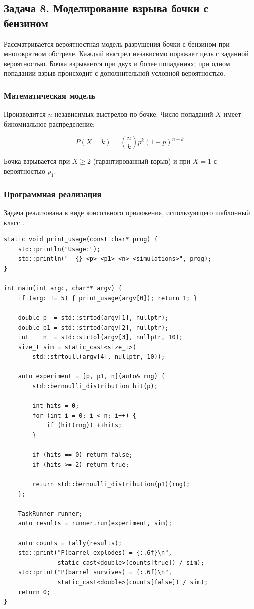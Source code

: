 \documentclass[14pt]{extarticle}
\renewcommand{\texttt}[1]{{\codefont \seqsplit{#1}}}
\begin{document}
\clearpage
\subsection{Задача 8. Моделирование взрыва бочки с бензином}
\label{sec:orged1e82e}

Рассматривается вероятностная модель разрушения бочки с бензином при многократном обстреле. Каждый выстрел независимо поражает цель с заданной вероятностью. Бочка взрывается при двух и более попаданиях; при одном попадании взрыв происходит с дополнительной условной вероятностью.
\subsubsection{Математическая модель}
\label{sec:orgaa5fbb5}

Производится \(n\) независимых выстрелов по бочке. Число попаданий \(X\) имеет биномиальное распределение:

$$P(X = k) = \binom{n}{k} p^k (1-p)^{n-k}$$

Бочка взрывается при \(X \ge 2\) (гарантированный взрыв) и при \(X = 1\) с вероятностью \(p_1\).
\subsubsection{Программная реализация}
\label{sec:orge2c9e51}

Задача реализована в виде консольного приложения, использующего шаблонный класс \texttt{TaskRunner}.

\begin{listing}[htbp]
\caption{Полная программа моделирования взрыва бочки}
\begin{verbatim}
static void print_usage(const char* prog) {
    std::println("Usage:");
    std::println("  {} <p> <p1> <n> <simulations>", prog);
}

int main(int argc, char** argv) {
    if (argc != 5) { print_usage(argv[0]); return 1; }

    double p  = std::strtod(argv[1], nullptr);
    double p1 = std::strtod(argv[2], nullptr);
    int    n  = std::strtol(argv[3], nullptr, 10);
    size_t sim = static_cast<size_t>(
        std::strtoull(argv[4], nullptr, 10));

    auto experiment = [p, p1, n](auto& rng) {
        std::bernoulli_distribution hit(p);

        int hits = 0;
        for (int i = 0; i < n; i++) {
            if (hit(rng)) ++hits;
        }

        if (hits == 0) return false;
        if (hits >= 2) return true;

        return std::bernoulli_distribution(p1)(rng);
    };

    TaskRunner runner;
    auto results = runner.run(experiment, sim);

    auto counts = tally(results);
    std::print("P(barrel explodes) = {:.6f}\n",
               static_cast<double>(counts[true]) / sim);
    std::print("P(barrel survives) = {:.6f}\n",
               static_cast<double>(counts[false]) / sim);
    return 0;
}
\end{verbatim}
\end{listing}
\end{document}
